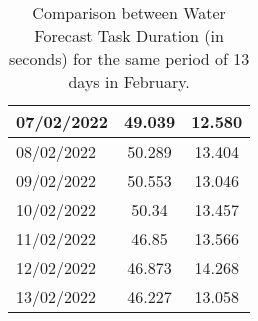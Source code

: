 \begin{table}[!htbp]
{\begin{tabular}{lcc}
    07/02/2022                                       & 49.039                                                                                             & 12.580                                                                                             \\ \hline
    08/02/2022                                       & 50.289                                                                                             & 13.404                                                                                             \\ \hline
    09/02/2022                                       & 50.553                                                                                             & 13.046                                                                                             \\ \hline
    10/02/2022                                       & 50.34                                                                                              & 13.457                                                                                             \\ \hline
    11/02/2022                                       & 46.85                                                                                              & 13.566                                                                                             \\ \hline
    12/02/2022                                       & 46.873                                                                                             & 14.268                                                                                             \\ \hline
    13/02/2022                                       & 46.227                                                                                             & 13.058                                                                                             \\ \hline
    \end{tabular}%
    }
    \caption{Comparison between Water Forecast Task Duration (in seconds) for the same period of 13 days in February.}
    \label{tab:water-forecast-task-duration}
    \end{table}